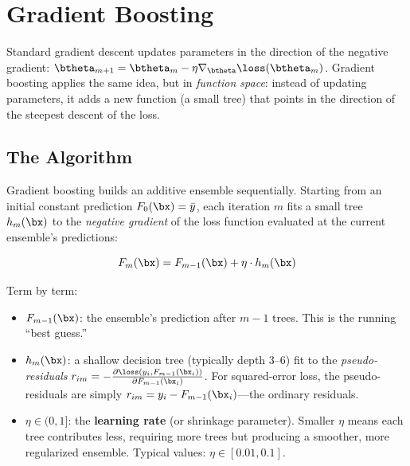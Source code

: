 \section{Gradient Boosting}
\label{sec:gradient-boosting}

\begin{prereq}
Standard gradient descent updates parameters in the direction of the negative gradient: $\btheta_{m+1} = \btheta_m - \eta \nabla_{\btheta} \loss(\btheta_m)$.
Gradient boosting applies the same idea, but in \emph{function space}: instead of updating parameters, it adds a new function (a small tree) that points in the direction of the steepest descent of the loss.
\end{prereq}

\subsection{The Algorithm}

Gradient boosting builds an additive ensemble sequentially.
Starting from an initial constant prediction $F_0(\bx) = \bar{y}$, each iteration $m$ fits a small tree $h_m(\bx)$ to the \emph{negative gradient} of the loss function evaluated at the current ensemble's predictions:

\begin{equation}
F_m(\bx) = F_{m-1}(\bx) + \eta \cdot h_m(\bx)
\label{eq:gbm-update}
\end{equation}

Term by term:
\begin{itemize}[nosep]
  \item $F_{m-1}(\bx)$: the ensemble's prediction after $m{-}1$ trees. This is the running ``best guess.''
  \item $h_m(\bx)$: a shallow decision tree (typically depth 3--6) fit to the \emph{pseudo-residuals} $r_{im} = -\frac{\partial \loss(y_i, F_{m-1}(\bx_i))}{\partial F_{m-1}(\bx_i)}$. For squared-error loss, the pseudo-residuals are simply $r_{im} = y_i - F_{m-1}(\bx_i)$---the ordinary residuals.
  \item $\eta \in (0, 1]$: the \textbf{learning rate} (or shrinkage parameter). Smaller $\eta$ means each tree contributes less, requiring more trees but producing a smoother, more regularized ensemble. Typical values: $\eta \in [0.01, 0.1]$.
\end{itemize}

